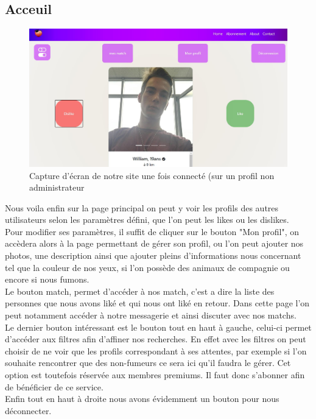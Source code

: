 \documentclass[12pt]{report}
\begin{document}
\subsection{Acceuil}
\begin{figure}[h!]
	\begin{center}
		\includegraphics[scale=0.5]{principal.jpg}
	\end{center}
		\caption{Capture d'écran de notre site une fois connecté (sur un profil non administrateur}
\end{figure}
Nous voila enfin sur la page principal on peut y voir les profils des autres utilisateurs selon les paramètres défini, que l'on peut les likes ou les dislikes.\\
 Pour modifier ses paramètres, il suffit de cliquer sur le bouton "Mon profil", on accèdera alors à la page permettant de gérer son profil, ou l'on peut ajouter nos photos, une description ainsi que ajouter pleins d'informations nous concernant tel que la couleur de nos yeux, si l'on possède des animaux de compagnie ou encore si nous fumons.\\
Le bouton match, permet d'accéder à nos match, c'est a dire la liste des personnes que nous avons liké et qui nous ont liké en retour. Dans cette page l'on peut notamment accéder à notre messagerie et ainsi discuter avec nos matchs.
\\
Le dernier bouton intéressant est le bouton tout en haut à gauche, celui-ci permet d'accéder aux filtres afin d'affiner nos recherches. En effet avec les filtres on peut choisir de ne voir que les profils correspondant à ses attentes, par exemple si l'on souhaite rencontrer que des non-fumeurs ce sera ici qu'il faudra le gérer. Cet option est toutefois réservée aux membres premiums. Il faut donc s'abonner afin de bénéficier de ce service.\\
Enfin tout en haut à droite nous avons évidemment un bouton pour nous déconnecter.
\clearpage
\end{document}
